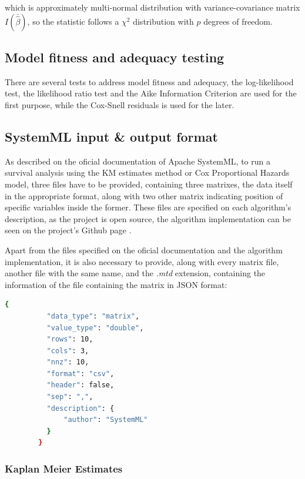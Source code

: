 \documentclass[11pt]{book} %
\begin{document}
        which is approximately multi-normal distribution with variance-covariance matrix $I(\bar{\widehat{\beta}})$, so the statistic follows a $\chi^2$ distribution with $p$ degrees of freedom.

    \subsection{Model fitness and adequacy testing}

      There are several tests to address model fitness and adequacy, the log-likelihood test, the likelihood ratio test and the Aike Information Criterion are used for the first purpose, while the Cox-Snell residuals is used for the later.

    \subsection{SystemML input \& output format}

      As described on the oficial documentation of Apache SystemML, to run a survival analysis using the KM estimates method or Cox Proportional Hazards model, three files have to be provided, containing three matrixes, the data itself in the appropriate format, along with two other matrix indicating position of specific variables inside the former. These files are specified on each algorithm's description, as the project is open source, the algorithm implementation can be seen on the project's Github page \cite{systemml_github_page}.

      Apart from the files specified on the oficial documentation and the algorithm implementation, it is also necessary to provide, along with every matrix file, another file with the same name, and the \emph{.mtd} extension, containing the information of the file containing the matrix in JSON format:

      \begin{lstlisting}[label=matrix_metadata_file, language=sh, caption=Example of matrix metadata file in JSON format]
        {
          "data_type": "matrix",
          "value_type": "double",
          "rows": 10,
          "cols": 3,
          "nnz": 10,
          "format": "csv",
          "header": false,
          "sep": ",",
          "description": {
              "author": "SystemML"
          }
        }
      \end{lstlisting}

\newpage

    \subsubsection{Kaplan Meier Estimates}
\end{document}
